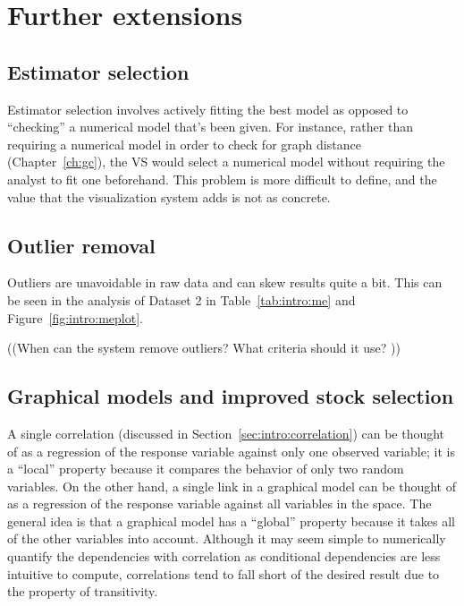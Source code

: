 \section{Further extensions}
\label{sec:futurework}

\subsection{Estimator selection}
\label{sec:futurework:estimatorselection}

Estimator selection involves actively fitting the best model as opposed to
``checking'' a numerical model that’s been given. For instance, rather than 
requiring a numerical model in order to check for graph distance 
(Chapter~\ref{ch:gc}), the VS would select a numerical model without requiring 
the analyst to fit one beforehand. This problem is more difficult
to define, and the value that the visualization system adds is not as concrete.

\subsection{Outlier removal}
\label{sec:futurework:outlier}

Outliers are unavoidable in raw data and can skew results quite a bit. This can 
be seen in the analysis of Dataset 2 in Table~\ref{tab:intro:me} and 
Figure~\ref{fig:intro:meplot}. 

((When can the system remove outliers? What criteria should it use? ))

\subsection{Graphical models and improved stock selection}
\label{sec:futurework:graphicalmodel}

A single correlation (discussed in Section~\ref{sec:intro:correlation}) can be 
thought of as a regression of the response variable
against only one observed variable; it is a ``local'' property because it
compares the behavior of only two random variables. On the other hand, a single
link in a graphical model can be thought of as a regression of the response
variable against all variables in the space. The general idea is that a 
graphical model has a ``global'' property because it takes all
of the other variables into account. Although it may seem simple to numerically
quantify the dependencies with correlation as conditional dependencies are less
intuitive to compute, correlations tend to fall short of the desired result due
to the property of transitivity.

